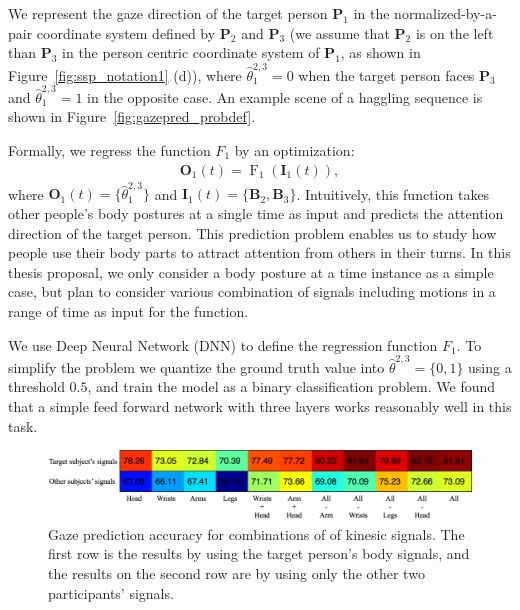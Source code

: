 We represent the gaze direction of the target person $\mathbf{P}_1$ in the normalized-by-a-pair coordinate system defined by $\mathbf{P}_2$ and $\mathbf{P}_3$ (we assume that $\mathbf{P}_2$ is on the left than $\mathbf{P}_3$ in the person centric coordinate system of $\mathbf{P}_1$, as shown in Figure~\ref{fig:ssp_notation1} (d)), where $\hat{\theta}_1^{2,3}=0$ when the target person faces $\mathbf{P}_3$ and $\hat{\theta}_1^{2,3}=1$ in the opposite case. An example scene of a haggling sequence is shown in Figure~\ref{fig:gazepred_probdef}.

Formally, we regress the function $F_1$ by an optimization:
\begin{align}
\mathbf{O}_1(t) = \operatorname{F}_1 \left( \mathbf{I}_1  (t) \right),
\end{align}
where $\mathbf{O}_1(t) = \{ \hat{\theta}^{2,3}_1 \}$ and $\mathbf{I}_1(t) = \{ \mathbf{B}_2, \mathbf{B}_3 \}$. Intuitively, this function takes other people's body postures at a single time as input and predicts the attention direction of the target person. This prediction problem enables us to study how people use their body parts to attract attention from others in their turns. In this thesis proposal, we only consider a body posture at a time instance as a simple case, but plan to consider various combination of signals including motions in a range of time as input for the function. 

We use Deep Neural Network (DNN) to define the regression function $F_1$. To simplify the problem we quantize the ground truth value into $\hat{\theta}^{2,3} = \{0,1\}$ using a threshold $0.5$, and train the model as a binary classification problem. We found that a simple feed forward network with three layers works reasonably well in this task.
%


\begin{figure}[t]
	\centering
	\includegraphics[width=\textwidth]{figures/model4_static}
	\caption{Gaze prediction accuracy for combinations of of kinesic signals. The first row is the results by using the target person's body signals, and the results on the second row are by using only the other two participants' signals.} 
	\label{fig:prediction_accuracy}
\end{figure}

